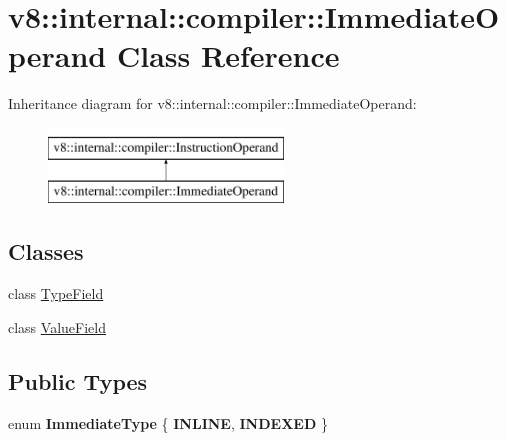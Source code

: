 \hypertarget{classv8_1_1internal_1_1compiler_1_1ImmediateOperand}{}\section{v8\+:\+:internal\+:\+:compiler\+:\+:Immediate\+Operand Class Reference}
\label{classv8_1_1internal_1_1compiler_1_1ImmediateOperand}
Inheritance diagram for v8\+:\+:internal\+:\+:compiler\+:\+:Immediate\+Operand\+:\begin{figure}[H]
\begin{center}
\leavevmode
\includegraphics[height=2.000000cm]{classv8_1_1internal_1_1compiler_1_1ImmediateOperand}
\end{center}
\end{figure}
\subsection*{Classes}
\begin{DoxyCompactItemize}
\item 
class \mbox{\hyperlink{classv8_1_1internal_1_1compiler_1_1ImmediateOperand_1_1TypeField}{Type\+Field}}
\item 
class \mbox{\hyperlink{classv8_1_1internal_1_1compiler_1_1ImmediateOperand_1_1ValueField}{Value\+Field}}
\end{DoxyCompactItemize}
\subsection*{Public Types}
\begin{DoxyCompactItemize}
\item 
\mbox{\label{classv8_1_1internal_1_1compiler_1_1ImmediateOperand_a2eb49a40716bc9e70b13e38b3fd612c3}} 
enum {\bfseries Immediate\+Type} \{ {\bfseries I\+N\+L\+I\+NE}, 
{\bfseries I\+N\+D\+E\+X\+ED}
 \}
\end{DoxyCompactItemize}
